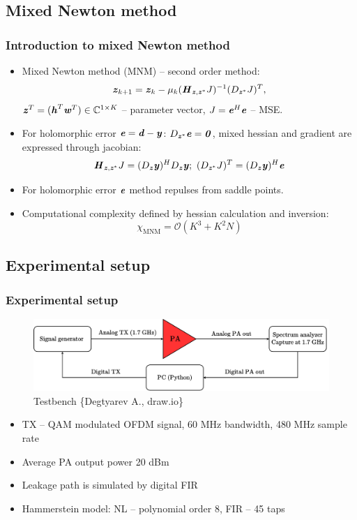 \documentclass{beamer}
\newcommand{\bit}[1]{\ensuremath{\textbf{\textit{#1}}}}
\begin{document}
\subsection{Mixed Newton method}
\begin{frame}
	\frametitle{Introduction to mixed Newton method}
	\begin{itemize}
		\item Mixed Newton method (MNM) -- second order method:
		\begin{equation}
			\bit{z}_{k+1}=\bit{z}_{k}-\mu_k(\bit{H}_{\bit{z}, \bit{z}^*}J)^{-1}(D_{\bit{z}^*}J)^T,
		\end{equation}
		$\bit{z}^T=(\bit{h}^T \bit{w}^T)\in\mathbb{C}^{1\times K}$ -- parameter vector, $J=\bit{e}^H\bit{e}$ -- MSE.
		\item For holomorphic error $\bit{e}=\bit{d}-\bit{y}$: $D_{\bit{z}^*}\bit{e}=\bit{0}$, mixed hessian and gradient are expressed through jacobian:
		\begin{equation}
			\bit{H}_{\bit{z}, \bit{z}^*}J=(D_{\bit{z}}\bit{y})^HD_{\bit{z}}\bit{y};
			\text{			}
			(D_{\bit{z}^*}J)^T=(D_{\bit{z}}\bit{y})^H\bit{e}
		\end{equation}
		\item For holomorphic error $\bit{e}$ method repulses from saddle points.
		\item Computational complexity defined by hessian calculation and inversion:
		\begin{equation}
			\chi_{\text{MNM}}=\mathcal{O}(K^3+K^2N)
		\end{equation}
	\end{itemize}
\end{frame}

\subsection{Experimental setup}
\begin{frame}
	\frametitle{Experimental setup}
	\begin{figure}[htbp]
		\centering
		\includegraphics[scale=0.15]{../figures/install/install.pdf}
		\caption{Testbench \{Degtyarev A., draw.io\}}
	\end{figure}
	\begin{itemize}
		\item TX -- QAM modulated OFDM signal, 60 MHz bandwidth, 480 MHz sample rate
		\item Average PA output power 20 dBm
		\item Leakage path is simulated by digital FIR
		\item Hammerstein model: NL -- polynomial order 8, FIR -- 45 taps
	\end{itemize}
\end{frame}
\end{document}
